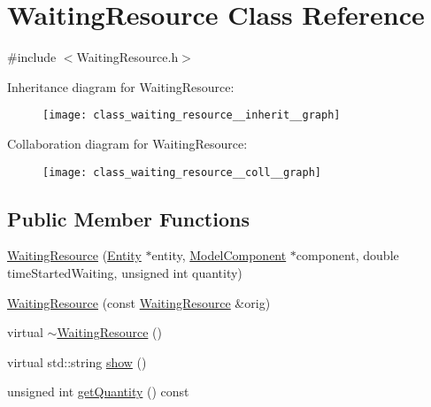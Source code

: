 \hypertarget{class_waiting_resource}{\section{Waiting\-Resource Class Reference}
\label{class_waiting_resource}
}


{\ttfamily \#include $<$Waiting\-Resource.\-h$>$}



Inheritance diagram for Waiting\-Resource\-:\nopagebreak
\begin{figure}[H]
\begin{center}
\leavevmode
\texttt{[image: class\_waiting\_resource\_\_inherit\_\_graph]}
\end{center}
\end{figure}


Collaboration diagram for Waiting\-Resource\-:\nopagebreak
\begin{figure}[H]
\begin{center}
\leavevmode
\texttt{[image: class\_waiting\_resource\_\_coll\_\_graph]}
\end{center}
\end{figure}
\subsection*{Public Member Functions}
\begin{DoxyCompactItemize}
\item 
\hyperlink{class_waiting_resource_a845b5f09fb41f14f9d084f17094560d5}{Waiting\-Resource} (\hyperlink{class_entity}{Entity} $\ast$entity, \hyperlink{class_model_component}{Model\-Component} $\ast$component, double time\-Started\-Waiting, unsigned int quantity)
\item 
\hyperlink{class_waiting_resource_a7780ace7c4d94f544e7f894c5daaa2f8}{Waiting\-Resource} (const \hyperlink{class_waiting_resource}{Waiting\-Resource} \&orig)
\item 
virtual \hyperlink{class_waiting_resource_ac25ae06be17218e803d623fb1398aa8a}{$\sim$\-Waiting\-Resource} ()
\item 
virtual std\-::string \hyperlink{class_waiting_resource_afb0323a90d99b50d66de7f38d069b122}{show} ()
\item 
unsigned int \hyperlink{class_waiting_resource_a3a2be33ed8850145e393e8bf29c6c7ca}{get\-Quantity} () const 
\end{DoxyCompactItemize}


